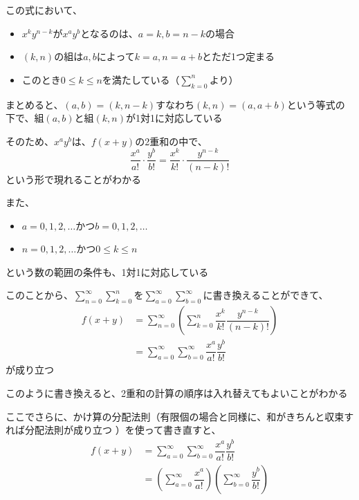 \documentclass[../book_jiriki_calc]{subfiles}
\begin{document}
この式において、
\begin{itemize}
  \item $x^ky^{n-k}$が$x^ay^b$となるのは、$a=k, b=n-k$の場合
  \item $(k,n)$の組は$a,b$によって$k=a, n=a+b$とただ1つ定まる
  \item このとき$0 \leq k \leq n$を満たしている（$\displaystyle\sum_{k=0}^{n}$より）
\end{itemize}

まとめると、$(a,b)=(k,n-k)$すなわち$(k, n) = (a, a+b)$という等式の下で、組$(a,b)$と組$(k,n)$が1対1に対応している

\br

そのため、$x^ay^b$は、$f(x+y)$の2重和の中で、
\begin{equation}
  \dfrac{x^a}{a!} \cdot \dfrac{y^b}{b!} = \dfrac{x^k}{k!} \cdot \dfrac{y^{n-k}}{(n-k)!}
\end{equation}
という形で現れることがわかる

\br

また、
\begin{itemize}
  \item $a=0,1,2,\ldots$かつ$b=0,1,2,\ldots$
  \item $n=0,1,2,\ldots$かつ$0 \leq k \leq n$
\end{itemize}
という数の範囲の条件も、1対1に対応している

\br

このことから、$\displaystyle\sum_{n=0}^{\infty}\sum_{k=0}^{n}$を$\displaystyle\sum_{a=0}^{\infty}\sum_{b=0}^{\infty}$に書き換えることができて、
\begin{align}
  f(x+y) & = \sum_{n=0}^{\infty} \left( \sum_{k=0}^{n} \dfrac{x^k}{k!} \dfrac{y^{n-k}}{(n-k)!} \right) \\
         & = \sum_{a=0}^{\infty} \sum_{b=0}^{\infty} \dfrac{x^a}{a!} \dfrac{y^b}{b!}
\end{align}
が成り立つ

このように書き換えると、2重和の計算の順序は入れ替えてもよいことがわかる

\sectionline

ここでさらに、かけ算の分配法則（有限個の場合と同様に、和がきちんと収束すれば分配法則が成り立つ
）を使って書き直すと、
\begin{align}
  f(x+y) & = \sum_{a=0}^{\infty} \sum_{b=0}^{\infty} \dfrac{x^a}{a!} \dfrac{y^b}{b!}                           \\
         & = \left(\sum_{a=0}^{\infty} \dfrac{x^a}{a!}\right) \left(\sum_{b=0}^{\infty} \dfrac{y^b}{b!}\right)
\end{align}
\end{document}
